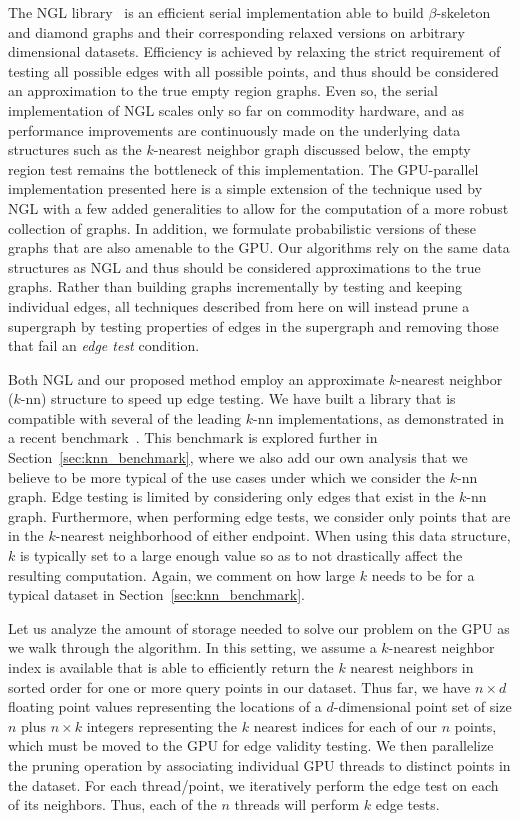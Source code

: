 The NGL library~\cite{CorreaLindstrom2011} is an efficient serial implementation able to build $\beta$-skeleton and diamond graphs and their corresponding relaxed versions on arbitrary dimensional datasets.
%
Efficiency is achieved by relaxing the strict requirement of testing all possible edges with all possible points, and thus should be considered an approximation to the true empty region graphs.
%
Even so, the serial implementation of NGL scales only so far on commodity hardware, and as performance improvements are continuously made on the underlying data structures such as the $k$-nearest neighbor graph discussed below, the empty region test remains the bottleneck of this implementation.
%
The GPU-parallel implementation presented here is a simple extension of the technique used by NGL with a few added generalities to allow for the computation of a more robust collection of graphs.
%
In addition, we formulate probabilistic versions of these graphs that are also amenable to the GPU.
%
Our algorithms rely on the same data structures as NGL and thus should be considered approximations to the true graphs.
%
Rather than building graphs incrementally by testing and keeping individual edges, all techniques described from here on will instead prune a supergraph by testing properties of edges in the supergraph and removing those that fail an \emph{edge test} condition.

Both NGL and our proposed method employ an approximate $k$-nearest neighbor ($k$-nn) structure to speed up edge testing.
%
We have built a library that is compatible with several of the leading $k$-nn implementations, as demonstrated in a recent benchmark~\cite{AumullerBernhardssonFaithfull2017}.
%
This benchmark is explored further in Section~\ref{sec:knn_benchmark}, where we also add our own analysis that we believe to be more typical of the use cases under which we consider the $k$-nn graph.
%
Edge testing is limited by considering only edges that exist in the $k$-nn graph.
%
Furthermore, when performing edge tests, we consider only points that are in the $k$-nearest neighborhood of either endpoint.
%
When using this data structure, $k$ is typically set to a large enough value so as to not drastically affect the resulting computation.
%
Again, we comment on how large $k$ needs to be for a typical dataset in Section~\ref{sec:knn_benchmark}.

Let us analyze the amount of storage needed to solve our problem on the GPU as we walk through the algorithm.
%
In this setting, we assume a $k$-nearest neighbor index is available that is able to efficiently return the $k$ nearest neighbors in sorted order for one or more query points in our dataset.
%
Thus far, we have $n \times d$ floating point values representing the locations of a $d$-dimensional point set of size $n$ plus $n \times k$ integers representing the $k$ nearest indices for each of our $n$ points, which must be moved to the GPU for edge validity testing.
%
We then parallelize the pruning operation by associating individual GPU threads to distinct points in the dataset.
%
For each thread/point, we iteratively perform the edge test on each of its neighbors.
%
Thus, each of the $n$ threads will perform $k$ edge tests.

